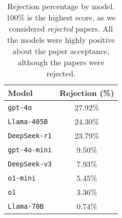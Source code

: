 \begin{table}[ht]
\centering
\caption{Rejection percentage by model. 100\% is the highest score, as we considered \textit{rejected} papers. All the models were highly positive about the paper acceptance, although the papers were rejected.}
\label{tab:rejection_percent}
\begin{tabular}{lc}
\toprule
Model       & Rejection (\%) \\
\midrule
\texttt{gpt-4o}      & 27.92\% \\
\texttt{Llama-405B}  & 24.30\% \\
\texttt{DeepSeek-r1} & 23.79\% \\
\texttt{gpt-4o-mini} & 9.50\%  \\
\texttt{DeepSeek-v3} & 7.93\%  \\
\texttt{o1-mini}     & 5.45\%  \\
\texttt{o1}          & 3.36\%  \\
\texttt{Llama-70B}   & 0.74\%  \\
\bottomrule
\end{tabular}
\end{table}


